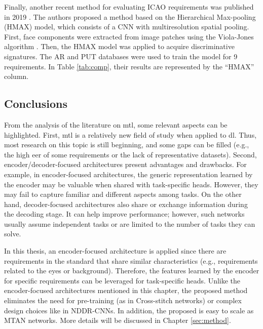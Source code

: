 Finally, another recent method for evaluating ICAO requirements was published in 2019 \citep{nourbakhshfacial}. The authors proposed a method based on the Hierarchical Max-pooling (HMAX) model, which consists of a CNN with multiresolution spatial pooling. First, face components were extracted from image patches using the Viola-Jones algorithm \citep{viola2001rapid}. Then, the HMAX model was applied to acquire discriminative signatures. The AR \citep{martinez1998ar} and PUT \citep{kasinski2008put} databases were used to train the model for 9 requirements. In Table \ref{tab:comp}, their results are represented by the ``HMAX'' column.
 
\subsection{Conclusions}
 
From the analysis of the literature on \acl{mtl}, some relevant aspects can be highlighted. First, \acs{mtl} is a relatively new field of study when applied to \acl{dl}. Thus, most research on this topic is still beginning, and some gaps can be filled (e.g., the high \acs{eer} of some requirements or the lack of representative datasets). Second, encoder/decoder-focused architectures present advantages and drawbacks. For example, in encoder-focused architectures, the generic representation learned by the encoder may be valuable when shared with task-specific heads. However, they may fail to capture familiar and different aspects among tasks. On the other hand, decoder-focused architectures also share or exchange information during the decoding stage. It can help improve performance; however, such networks usually assume independent tasks or are limited to the number of tasks they can solve. 
 
In this thesis, an encoder-focused architecture is applied since there are requirements in the \icao standard that share similar characteristics (e.g., requirements related to the eyes or background). Therefore, the features learned by the encoder for specific requirements can be leveraged for task-specific heads. Unlike the encoder-focused architectures mentioned in this chapter, the proposed method eliminates the need for pre-training (as in Cross-stitch networks) or complex design choices like in NDDR-CNNs. In addition, the proposed \methodname is easy to scale as MTAN networks. More details will be discussed in Chapter \ref{sec:method}.
 
